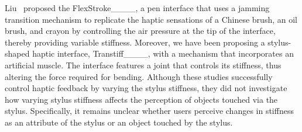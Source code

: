 
Liu \etal\ proposed the FlexStroke____, a pen interface that uses a jamming transition mechanism to replicate the haptic sensations of a Chinese brush, an oil brush, and crayon by controlling the air pressure at the tip of the interface, thereby providing variable stiffness. 
Moreover, we have been proposing a stylus-shaped haptic interface, Transtiff____, with a mechanism that incorporates an artificial muscle.
The interface features a joint that controls its stiffness, thus altering the force required for bending.
Although these studies successfully control haptic feedback by varying the stylus stiffness, they did not investigate how varying stylus stiffness affects the perception of objects touched via the stylus.
Specifically, it remains unclear whether users perceive changes in stiffness as an attribute of the stylus or an object touched by the stylus.  

